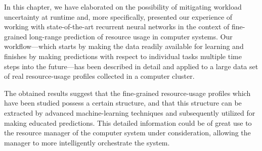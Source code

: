 In this chapter, we have elaborated on the possibility of mitigating workload
uncertainty at runtime and, more specifically, presented our experience of
working with state-of-the-art recurrent neural networks in the context of
fine-grained long-range prediction of resource usage in computer systems. Our
workflow---which starts by making the data readily available for learning and
finishes by making predictions with respect to individual tasks multiple time
steps into the future---has been described in detail and applied to a large data
set of real resource-usage profiles collected in a computer cluster.

The obtained results suggest that the fine-grained resource-usage profiles which
have been studied possess a certain structure, and that this structure can be
extracted by advanced machine-learning techniques and subsequently utilized for
making educated predictions. This detailed information could be of great use to
the resource manager of the computer system under consideration, allowing the
manager to more intelligently orchestrate the system.
